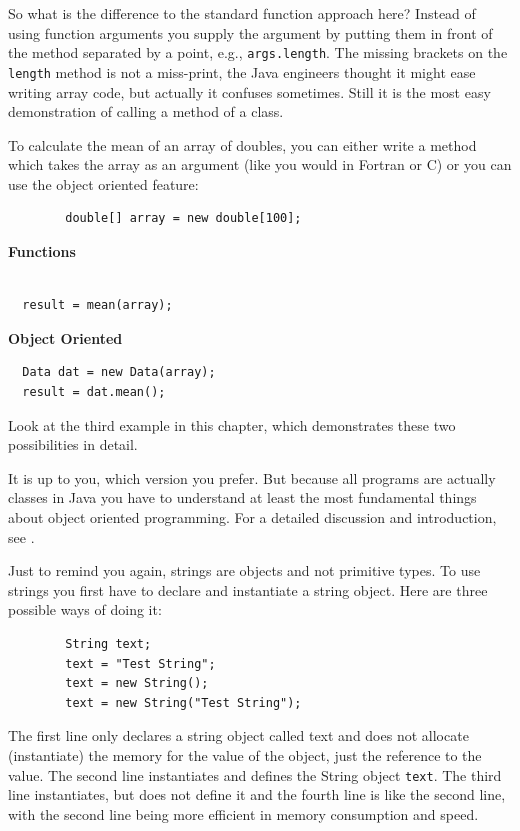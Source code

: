 So what is the difference to the standard function approach here?
Instead of using function arguments you supply the argument by 
putting them in front of the method separated by a point, e.g., 
\verb|args.length|. The missing brackets on the \verb|length| method
is not a miss-print, the Java engineers thought it might ease writing
array code, but actually it confuses sometimes. Still it is the
most easy demonstration of calling a method of a class.

To calculate the mean of an array of doubles, you can
either write a method which takes the array as an argument (like you would
in Fortran or C) or you can use the object
oriented feature:
\begin{small}
\begin{verbatim}
        double[] array = new double[100]; 
\end{verbatim}

\begin{minipage}{.47\textwidth}
\textbf{Functions}
\begin{verbatim}

  result = mean(array); 
\end{verbatim}
\end{minipage}
\begin{minipage}{.47\textwidth}
\textbf{Object Oriented}
\begin{verbatim}
  Data dat = new Data(array); 
  result = dat.mean();
\end{verbatim}
\end{minipage}
\end{small}
\vspace{.2cm}

\noindent Look at the third example in this chapter, which demonstrates these two
possibilities in detail.

It is up to you, which version you prefer. But because all programs are
actually classes in Java you have to understand at least the 
most fundamental things about object oriented programming. For a detailed
discussion and introduction, see \cite{javanutshell}.

Just to remind you again, strings are objects and not primitive 
types. To use strings you first have to declare and instantiate a string
object. Here are three possible ways of doing it:
\begin{verbatim}
        String text;
        text = "Test String";
        text = new String();
        text = new String("Test String");
\end{verbatim}
The first line only declares a string object called text and does not
allocate (instantiate) the memory for the value of the object, just
the reference to the value. The second line instantiates and 
defines the String object \verb|text|. The third line instantiates, but
does not define it and the fourth line is like the second line, with
the second line being more efficient in memory consumption and
speed.

